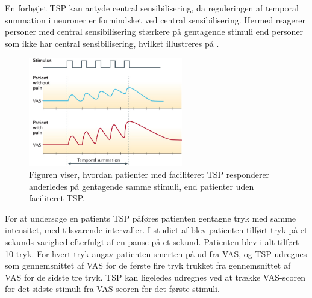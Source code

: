 En forhøjet TSP kan antyde central sensibilisering, da reguleringen af temporal summation i neuroner er formindsket ved central sensibilisering. \citep{Arendt-Nielsen2015b} Hermed reagerer personer med central sensibilisering stærkere på gentagende stimuli end personer som ikke har central sensibilisering, hvilket illustreres på . \citep{Arendt-Nielsen2015b} 

\begin{figure}[H] 
	\begin{center}
		\includegraphics[width=0.6\textwidth]{figures/dHTAanalyse/TSP_rask_syg.jpg}
	\end{center}
	\caption{Figuren viser, hvordan patienter med faciliteret TSP responderer anderledes på gentagende samme stimuli, end patienter uden faciliteret TSP. \citep{Reynolds2016}} 
	\label{fig:TSP_rask_syg} 
\end{figure} \vspace{-.25cm}

For at undersøge en patients TSP påføres patienten gentagne tryk med samme intensitet, med tilsvarende intervaller. I studiet af  blev patienten tilført tryk på et sekunds varighed efterfulgt af en pause på et sekund. Patienten blev i alt tilført 10 tryk. For hvert tryk angav patienten smerten på ud fra VAS, og TSP udregnes som gennemsnittet af VAS for de første fire tryk trukket fra gennemsnittet af VAS for de sidste tre tryk. \citep{Petersen2016} TSP kan ligeledes udregnes ved at trække VAS-scoren for det sidste stimuli fra VAS-scoren for det første stimuli. \citep{Petersen2015} 

